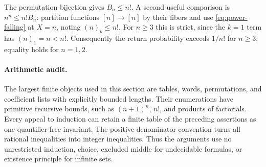 The permutation bijection gives $B_n\leq n!$. A second useful comparison is
$n^n\leq n!B_n$: partition functions $[n]\to[n]$ by their fibers and use
\eqref{eq:power-falling} at $X=n$, noting $(n)_k\leq n!$.
For $n\geq3$ this is strict, since the $k=1$ term has
$(n)_1=n<n!$. Consequently the return probability exceeds $1/n!$ for
$n\geq3$; equality holds for $n=1,2$.

\paragraph{Arithmetic audit.}
The largest finite objects used in this section are tables, words,
permutations, and coefficient lists with explicitly bounded lengths.
Their enumerations have primitive recursive bounds, such as $(n+1)^n$, $n!$,
and products of factorials. Every appeal to induction can retain a finite
table of the preceding assertions as one quantifier-free invariant. The
positive-denominator convention turns all rational inequalities into integer
inequalities. Thus the arguments use no unrestricted induction, choice,
excluded middle for undecidable formulas, or existence principle for infinite
sets.

